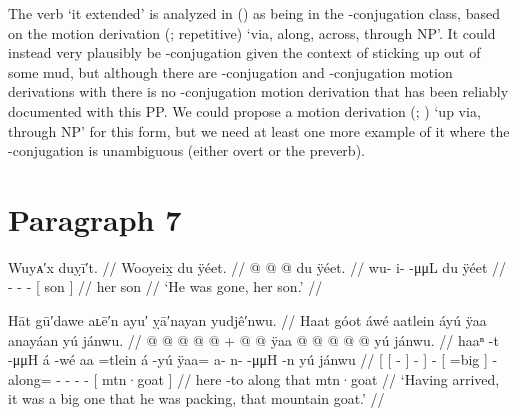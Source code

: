 The verb  ‘it extended’ is analyzed in (\lastx) as being in the -conjugation class, based on the motion derivation  (;  repetitive) ‘via, along, across, through NP’.
It could instead very plausibly be -conjugation given the context of sticking up out of some mud, but although there are -conjugation and -conjugation motion derivations with  there is no -conjugation motion derivation that has been reliably documented with this PP.
We could propose a motion derivation  (; ) ‘up via, through NP’ for this form, but we need at least one more example of it where the -conjugation is unambiguous (either overt  or the  preverb).

\section{Paragraph 7}\label{sec:92-para-7}

\ex\label{ex:92-139-absent-her-son}%
%
\begingl
	\glpreamble	Wuyᴀ′x duỵī′t. //
	\glpreamble	Wooyeix̱ du ÿéet. //
	\gla	{} @ {} @ {} @ {} {} du ÿéet. {} //
	\glb	wu- i-  -μμL {} du ÿéet {} //
	\glc	{}- -  - {}[  son {}] //
	\gld	{} {} {} {} {} her son {} //
	\glft	‘He was gone, her son.’
		//
\endgl
\xe


\ex\label{ex:92-140-packing-big-mtn-goat}%
%
\begingl
	\glpreamble	Hāt gū′dawe aʟē′n ayu′ ỵā′nayan yudjê′nwu. //
	\glpreamble	Haat góot áwé aatlein áyú ÿaa anayáan yú jánwu. //
	\gla	{} {}  @ {} {}  @ {} @ {} @ {} {}  @ {} +
		{}  @ {} {}  @ {} 
		ÿaa @  @ {} @ {} @ {} @ {}
		{} yú jánwu. {} //
	\glb	{} {} haaⁿ -t {} {}  -μμH {} {} á -wé
		{} aa =tlein {} á -yú
		ÿaa= a- n-  -μμH -n
		{} yú jánwu {} //
	\glc	{}[ {}[  - {}]
			\·  - \· {}]
		 -
		{}[  =big {}]  -
		along= - -  - -
		{}[  mtn·goat {}] //
	\gld	{} {} here -to {}  {} {} {} {}
		 {}
		{}  {} {}  {}
		along  {} {} {} {}
		{} that mtn·goat {} //
	\glft	‘Having arrived, it was a big one that he was packing, that mountain goat.’
		//
\endgl
\xe

